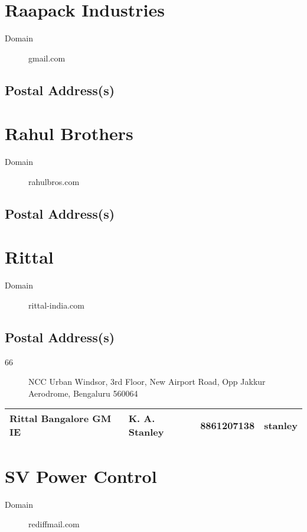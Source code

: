 \documentclass[a4paper, 11pt, twoside]{book}
\begin{document}
\section{Raapack Industries}\label{com:55}
\begin{description}
\item[Domain]gmail.com
\end{description}
\subsection*{Postal Address(s)}
\section{Rahul Brothers}\label{com:46}
\begin{description}
\item[Domain]rahulbros.com
\end{description}
\subsection*{Postal Address(s)}
\section{Rittal}\label{com:36}
\begin{description}
\item[Domain]rittal-india.com
\end{description}
\subsection*{Postal Address(s)}
\begin{description}
\item [66]NCC Urban Windsor, 3rd Floor, New Airport Road, Opp Jakkur Aerodrome, Bengaluru 560064
\end{description}
\begin{tabular}{|p{4cm}|p{2cm}|p{2cm}|p{3cm}|}
\hline
Rittal Bangalore GM IE & K. A. Stanley & 8861207138 & stanley \\ \hline
\end{tabular}
\section{SV Power Control}\label{com:12}
\begin{description}
\item[Domain]rediffmail.com
\end{description}
\end{document}
